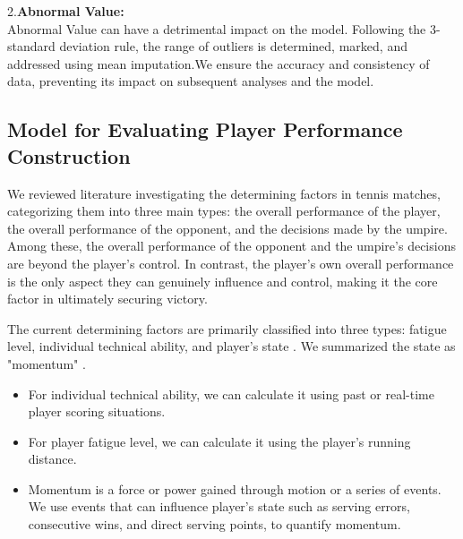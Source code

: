 \documentclass{mcmthesis}  %
\begin{document}
2.\textbf{Abnormal Value:}\\
Abnormal Value can have a detrimental impact on the model. Following the 3-standard deviation rule, the range of outliers is determined, marked, and addressed using mean imputation.We ensure the accuracy and consistency of data, preventing its impact on subsequent analyses and the model.


\subsection{Model for Evaluating Player Performance Construction}
\hspace{1.5em}We reviewed literature investigating the determining factors in tennis matches, categorizing them into three main types: the overall performance of the player, the overall performance of the opponent, and the decisions made by the umpire. Among these, the overall performance of the opponent and the umpire's decisions are beyond the player's control. In contrast, the player's own overall performance is the only aspect they can genuinely influence and control, making it the core factor in ultimately securing victory. 
\par The current determining factors are primarily classified into three types: fatigue level, individual technical ability, and player's state . We  summarized the state as "momentum" .\cite{QSTY202210018}
\begin{itemize}  %
\item For individual technical ability, we can calculate it using past or real-time player scoring situations.
\item For player fatigue level, we can calculate it using the player's running distance.
\item Momentum is a force or power gained through motion or a series of events. We use events that can influence player's state such as serving errors, consecutive wins, and direct serving points, to quantify momentum.
\end{itemize}  %
\end{document}
